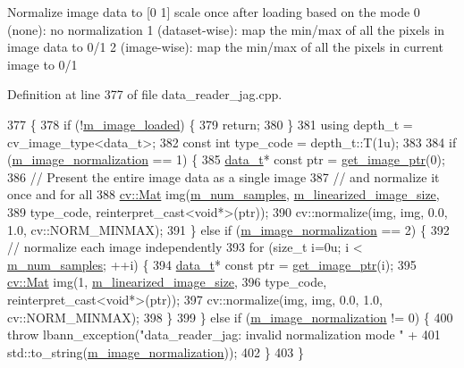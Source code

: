 Normalize image data to \mbox{[}0 1\mbox{]} scale once after loading based on the mode 0 (none)\+: no normalization 1 (dataset-\/wise)\+: map the min/max of all the pixels in image data to 0/1 2 (image-\/wise)\+: map the min/max of all the pixels in current image to 0/1 

Definition at line 377 of file data\+\_\+reader\+\_\+jag.\+cpp.


\begin{DoxyCode}
377                                       \{
378   \textcolor{keywordflow}{if} (!\hyperlink{classlbann_1_1data__reader__jag_a3f1691818996f73dc918dfd0e8f98a70}{m\_image\_loaded}) \{
379     \textcolor{keywordflow}{return};
380   \}
381   \textcolor{keyword}{using} depth\_t = cv\_image\_type<data\_t>;
382   \textcolor{keyword}{const} \textcolor{keywordtype}{int} type\_code = depth\_t::T(1u);
383 
384   \textcolor{keywordflow}{if} (\hyperlink{classlbann_1_1data__reader__jag_a351fe7aaccf8456fa97c9d9bf3dcd73d}{m\_image\_normalization} == 1) \{
385     \hyperlink{classlbann_1_1data__reader__jag_a7377d6c02c455f019a378489b9b8eab4}{data\_t}* \textcolor{keyword}{const} ptr = \hyperlink{classlbann_1_1data__reader__jag_aab51581a1b8175bf5da1b74454ef7701}{get\_image\_ptr}(0);
386     \textcolor{comment}{// Present the entire image data as a single image}
387     \textcolor{comment}{// and normalize it once and for all}
388     \hyperlink{base_8hpp_a68f11fdc31b62516cb310831bbe54d73}{cv::Mat} img(\hyperlink{classlbann_1_1data__reader__jag_a25ceffff7e8d6641e785efa033530011}{m\_num\_samples}, \hyperlink{classlbann_1_1data__reader__jag_a7c2aa5f489e7c7a3236c1f6c4a760048}{m\_linearized\_image\_size},
389                 type\_code, reinterpret\_cast<void*>(ptr));
390     cv::normalize(img, img, 0.0, 1.0, cv::NORM\_MINMAX);
391   \} \textcolor{keywordflow}{else} \textcolor{keywordflow}{if} (\hyperlink{classlbann_1_1data__reader__jag_a351fe7aaccf8456fa97c9d9bf3dcd73d}{m\_image\_normalization} == 2) \{
392     \textcolor{comment}{// normalize each image independently}
393     \textcolor{keywordflow}{for} (\textcolor{keywordtype}{size\_t} i=0u; i < \hyperlink{classlbann_1_1data__reader__jag_a25ceffff7e8d6641e785efa033530011}{m\_num\_samples}; ++i) \{
394       \hyperlink{classlbann_1_1data__reader__jag_a7377d6c02c455f019a378489b9b8eab4}{data\_t}* \textcolor{keyword}{const} ptr = \hyperlink{classlbann_1_1data__reader__jag_aab51581a1b8175bf5da1b74454ef7701}{get\_image\_ptr}(i);
395       \hyperlink{base_8hpp_a68f11fdc31b62516cb310831bbe54d73}{cv::Mat} img(1, \hyperlink{classlbann_1_1data__reader__jag_a7c2aa5f489e7c7a3236c1f6c4a760048}{m\_linearized\_image\_size},
396                   type\_code, reinterpret\_cast<void*>(ptr));
397       cv::normalize(img, img, 0.0, 1.0, cv::NORM\_MINMAX);
398     \}
399   \} \textcolor{keywordflow}{else} \textcolor{keywordflow}{if} (\hyperlink{classlbann_1_1data__reader__jag_a351fe7aaccf8456fa97c9d9bf3dcd73d}{m\_image\_normalization} != 0) \{
400     \textcolor{keywordflow}{throw} lbann\_exception(\textcolor{stringliteral}{"data\_reader\_jag: invalid normalization mode "} +
401                           std::to\_string(\hyperlink{classlbann_1_1data__reader__jag_a351fe7aaccf8456fa97c9d9bf3dcd73d}{m\_image\_normalization}));
402   \}
403 \}
\end{DoxyCode}
